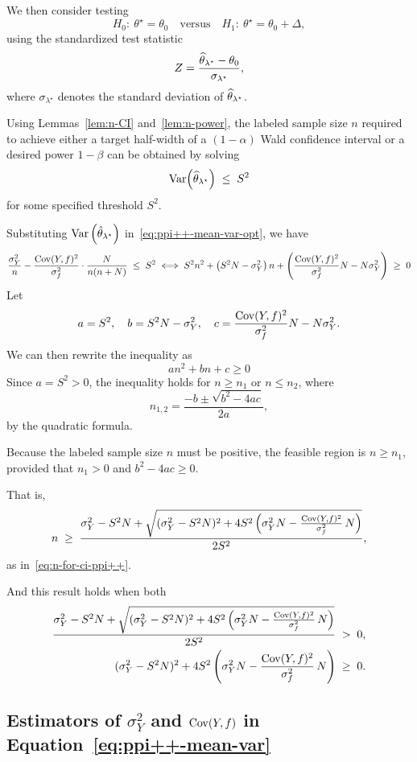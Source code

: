 \noindent
We then consider testing
\[
H_0:\ \theta^\star=\theta_0
\quad\text{versus}\quad
H_1:\ \theta^\star=\theta_0+\Delta,
\]
using the standardized test statistic
\[
Z=\frac{\widehat{\theta}_{\lambda^\star}-\theta_0}{
\sigma_{\lambda^\star}},\]where $\sigma_{\lambda^\star}$ denotes the standard deviation of $\widehat{\theta}_{\lambda^\star}$.

\noindent
Using Lemmas~\ref{lem:n-CI} and~\ref{lem:n-power}, the labeled sample size $n$ required to achieve either a target half-width of a $(1-\alpha)$ Wald confidence interval or a desired power $1-\beta$ can be obtained by solving
\[
\mathrm{Var}\!\left(\widehat{\theta}_{\lambda^\star}\right) \;\le\; S^2
\]for some specified threshold $S^2$.

\noindent
Substituting $\mathrm{Var}\left(\hat{\theta}_{\lambda^\star}\right)$ in~\eqref{eq:ppi++-mean-var-opt}, we have
\begin{align*}
    \frac{\sigma_Y^2}{n}-\frac{\mathrm{Cov}(Y,f)^2}{\sigma_f^2}\cdot\frac{N}{n(n+N)} \;\le\; S^2
    \iff S^2n^2+\left(S^2N-\sigma^2_Y\right)n+\left(\frac{\mathrm{Cov}(Y,f)^2}{\sigma_f^2}N-N\sigma^2_Y\right)\;\geq\;0
\end{align*}
\noindent
Let
\[
a = S^2,\quad
b = S^2 N - \sigma_Y^2,\quad
c = \frac{\mathrm{Cov}(Y,f)^2}{\sigma_f^2}N - N\sigma_Y^2.
\]
We can then rewrite the inequality as
\[a n^2 + b n + c \ge 0\]
\noindent
Since $a = S^2 > 0$, the inequality holds for $n\ge n_1$ or $n\le n_2$, where \[
n_{1,2} =\frac{-b\pm\sqrt{b^2-4ac}}{2a},
\]by the quadratic formula.

\noindent
Because the labeled sample size $n$ must be positive, the feasible region is $n \ge n_1$, provided that $n_1 > 0$ and $b^2 - 4ac \ge 0$.

\noindent
That is, \begin{equation*}
n \;\ge\; 
\frac{ \sigma_Y^2 - S^2 N + \sqrt{(\sigma_Y^2 - S^2 N)^2 + 4 S^2\left(\sigma_Y^2 N - \frac{\mathrm{Cov}(Y,f)^2}{\sigma_f^2}\,N\right)} }{2 S^2},
\end{equation*} as in~\eqref{eq:n-for-ci-ppi++}.

\noindent
And this result holds when both\begin{align*}
    \frac{ \sigma_Y^2 - S^2 N + \sqrt{(\sigma_Y^2 - S^2 N)^2 + 4 S^2\left(\sigma_Y^2 N - \frac{\mathrm{Cov}(Y,f)^2}{\sigma_f^2}\,N\right)} }{2 S^2}\;&>\;0,\\
    (\sigma_Y^2 - S^2 N)^2 + 4 S^2\left(\sigma_Y^2 N - \frac{\mathrm{Cov}(Y,f)^2}{\sigma_f^2}\,N\right)\;&\geq\;0.
\end{align*}

\subsection{Estimators of $\sigma_Y^2$ and $\mathrm{Cov}(Y,f)$ in Equation~\eqref{eq:ppi++-mean-var}}


